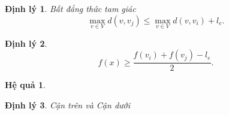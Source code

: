 \documentclass[12pt,a4paper]{report}
\newtheorem{dl}{Định lý}
\newtheorem{hq}{Hệ quả}
\begin{document}
\IncMargin{1em}
\begin{algorithm}

    \caption{Thuật toán Single-Center.}\label{algo_disjdecomp}
\end{algorithm}
\DecMargin{1em}


\begin{dl}{Bất đẳng thức tam giác}
\begin{equation}
	\max_{v \in V} d(v,v_j) \leq \max_{v \in V} d(v,v_i) + l_e.
\end{equation}
\end{dl}

\begin{dl}
\begin{equation}
	f(x) \geq \frac{f(v_i) + f(v_j) - l_e}{2}.
\end{equation}
\end{dl}

\begin{hq}

\end{hq}

\begin{dl}{Cận trên và Cận dưới}
\end{dl}
\end{document}
